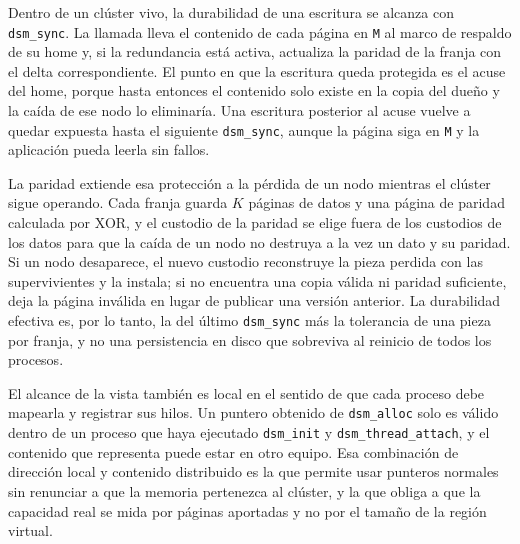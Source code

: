 Dentro de un clúster vivo, la durabilidad de una escritura se alcanza con \texttt{dsm\_sync}. La llamada lleva el contenido de cada página en \texttt{M} al marco de respaldo de su home y, si la redundancia está activa, actualiza la paridad de la franja con el delta correspondiente. El punto en que la escritura queda protegida es el acuse del home, porque hasta entonces el contenido solo existe en la copia del dueño y la caída de ese nodo lo eliminaría. Una escritura posterior al acuse vuelve a quedar expuesta hasta el siguiente \texttt{dsm\_sync}, aunque la página siga en \texttt{M} y la aplicación pueda leerla sin fallos.

La paridad extiende esa protección a la pérdida de un nodo mientras el clúster sigue operando. Cada franja guarda $K$ páginas de datos y una página de paridad calculada por XOR, y el custodio de la paridad se elige fuera de los custodios de los datos para que la caída de un nodo no destruya a la vez un dato y su paridad. Si un nodo desaparece, el nuevo custodio reconstruye la pieza perdida con las supervivientes y la instala; si no encuentra una copia válida ni paridad suficiente, deja la página inválida en lugar de publicar una versión anterior. La durabilidad efectiva es, por lo tanto, la del último \texttt{dsm\_sync} más la tolerancia de una pieza por franja, y no una persistencia en disco que sobreviva al reinicio de todos los procesos.

El alcance de la vista también es local en el sentido de que cada proceso debe mapearla y registrar sus hilos. Un puntero obtenido de \texttt{dsm\_alloc} solo es válido dentro de un proceso que haya ejecutado \texttt{dsm\_init} y \texttt{dsm\_thread\_attach}, y el contenido que representa puede estar en otro equipo. Esa combinación de dirección local y contenido distribuido es la que permite usar punteros normales sin renunciar a que la memoria pertenezca al clúster, y la que obliga a que la capacidad real se mida por páginas aportadas y no por el tamaño de la región virtual.
